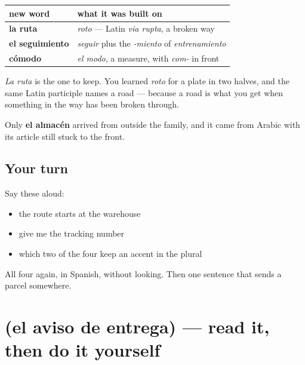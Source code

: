\begin{grammarlens}[title={Grammar Lens: two of the four were already yours}]
\noindent
\begin{tabularx}{\linewidth}{@{}>{\raggedright\arraybackslash}X>{\raggedright\arraybackslash}X@{}}
\toprule
\textbf{new word} & \textbf{what it was built on} \\
\midrule
\textbf{la ruta} & \emph{roto} — Latin \emph{via rupta}, a broken way \\
\textbf{el seguimiento} & \emph{seguir} plus the \emph{-miento} of \emph{entrenamiento} \\
\textbf{cómodo} & \emph{el modo}, a measure, with \emph{com-} in front \\
\bottomrule
\end{tabularx}

\emph{La ruta} is the one to keep. You learned \emph{roto} for a plate in two halves, and the same Latin participle names a road — because a road is what you get when something in the way has been broken through.

Only \textbf{el almacén} arrived from outside the family, and it came from Arabic with its article still stuck to the front.
\end{grammarlens}

\subsection*{Your turn}
Say these aloud:

\begin{itemize}
\raggedright
  \item the route starts at the warehouse
  \item give me the tracking number
  \item which two of the four keep an accent in the plural
\end{itemize}

\begin{tcolorbox}[breakable,colback=teal!4,colframe=teal!35!black,title={Before you move on}]
All four again, in Spanish, without looking. Then one sentence that sends a parcel somewhere.
\end{tcolorbox}
\section[Practice]{(el aviso de entrega) — read it, then do it yourself}

\label{lesson:ES-C452-sintesis-reparto}



